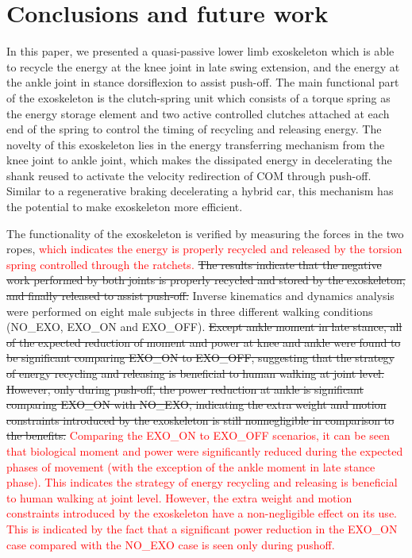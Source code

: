 \documentclass[twocolumn,cleanfoot,10pt]{asme2ej}
\begin{document}
\section{Conclusions and future work}
\label{sec:discussion}
In this paper, we presented a quasi-passive lower limb exoskeleton which is able to recycle the energy at the knee joint in late swing extension, and the energy at the ankle joint in stance dorsiflexion to assist push-off. The main functional part of the exoskeleton is the clutch-spring unit which consists of a torque spring as the energy storage element and two active controlled clutches attached at each end of the spring to control the timing of recycling and releasing energy. The novelty of this exoskeleton lies in the energy transferring mechanism from the knee joint to ankle joint, which makes the dissipated energy in decelerating the shank reused to activate the velocity redirection of COM through push-off. Similar to a regenerative braking decelerating a hybrid car, this mechanism has the potential to make exoskeleton more efficient.

The functionality of the exoskeleton is verified by measuring the forces in the two ropes, \textcolor{red}{which indicates the energy is properly recycled and released by the torsion spring controlled through the ratchets.} \sout{The results indicate that the negative work performed by both joints is properly recycled and stored by the exoskeleton, and finally released to assist push-off.} Inverse kinematics and dynamics analysis were performed on eight male subjects in three different walking conditions (NO\_EXO, EXO\_ON and EXO\_OFF). \sout{Except ankle moment in late stance, all of the expected reduction of moment and power at knee and ankle were found to be significant comparing EXO\_ON to EXO\_OFF, suggesting that the strategy of energy recycling and releasing is beneficial to human walking at joint level. However, only during push-off, the power reduction at ankle is significant comparing EXO\_ON with NO\_EXO, indicating the extra weight and motion constraints introduced by the exoskeleton is still nonnegligible in comparison to the benefits.}
\textcolor{red}{Comparing the EXO\_ON to EXO\_OFF scenarios, it can be seen that biological moment and power were significantly reduced during the expected phases of movement (with the exception of the ankle moment in late stance phase). This indicates the strategy of energy recycling and releasing is beneficial to human walking at joint level. However, the extra weight and motion constraints introduced by the exoskeleton have a non-negligible effect on its use. This is indicated by the fact that a significant power reduction in the EXO\_ON case compared with the NO\_EXO case is seen only during pushoff.}
\end{document}
